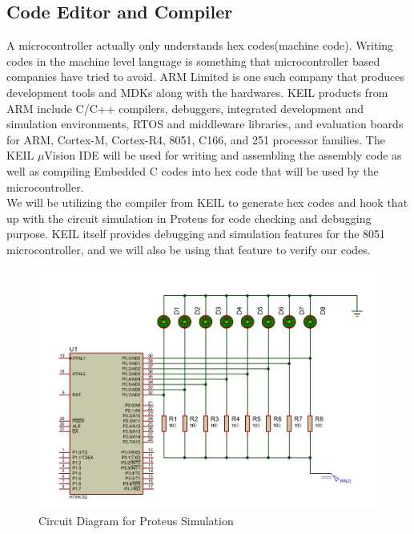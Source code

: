 \documentclass{lab_sheet}
\begin{document}
\subsection{Code Editor and Compiler}
A microcontroller actually only understands hex codes(machine code). 
Writing codes in the machine level language is something that microcontroller 
based companies have tried to avoid. ARM Limited is one such company that produces
 development tools and MDKs along with the hardwares. 
 KEIL products from ARM include C/C++ compilers, debuggers, integrated development and simulation environments, RTOS and middleware libraries, and evaluation boards for ARM, Cortex-M, Cortex-R4, 8051, C166, and 251 processor families. The KEIL $\mu$Vision IDE will be used for writing and assembling the assembly code as well as compiling Embedded C codes into hex code that will be used by the microcontroller. \\
We will be utilizing the compiler from KEIL to generate hex codes and hook that up with the circuit simulation in Proteus for code checking and debugging purpose. KEIL itself provides debugging and simulation features for the 8051 microcontroller, and we will also be using that feature to verify our codes.
\begin{figure}[H]
\centering
\includegraphics[scale=1]{../Figures/proteus}
\caption{Circuit Diagram for Proteus Simulation}
\label{fig:proteus}
\end{figure}
\end{document}
